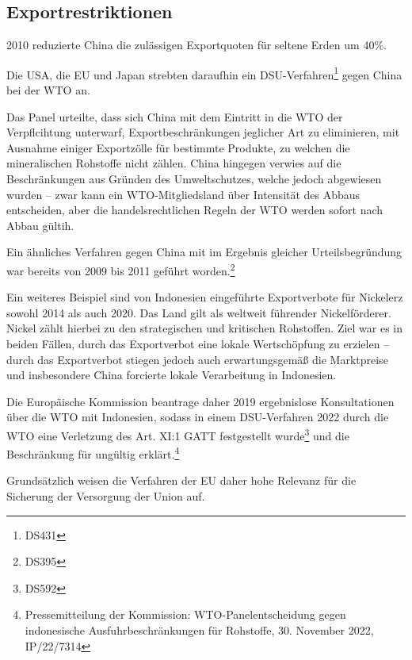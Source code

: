 \documentclass[12pt,a4paper,oneside]{book} %
\begin{document}
{	
	\subsection{Exportrestriktionen}
	
	2010 reduzierte China die zulässigen Exportquoten für seltene Erden um 40\%.
	
	Die USA, die EU und Japan strebten daraufhin ein DSU-Verfahren\footnote{DS431}  gegen China bei der WTO an.\autocite{EuZW 2012, 286}
	
	Das Panel urteilte, dass sich China mit dem Eintritt in die WTO der Verpflcihtung unterwarf, Exportbeschränkungen jeglicher Art zu eliminieren, mit Ausnahme einiger Exportzölle für bestimmte Produkte, zu welchen die mineralischen Rohstoffe nicht zählen. China hingegen verwies auf die Beschränkungen aus Gründen des Umweltschutzes, welche jedoch abgewiesen wurden -- zwar kann ein WTO-Mitgliedsland über Intensität des Abbaus entscheiden, aber die handelsrechtlichen Regeln der WTO werden sofort nach Abbau gültih.\autocites{EuZW 2014, 684}{EuZW 2014, 283}
	
	Ein ähnliches Verfahren gegen China mit im Ergebnis gleicher Urteilsbegründung war bereits von 2009 bis 2011 geführt worden.\footnote{DS395}

	Ein weiteres Beispiel sind von Indonesien eingeführte Exportverbote für Nickelerz sowohl 2014 als auch 2020. Das Land gilt als weltweit führender Nickelförderer.\autocite[52]{DERA Rohstoffinformation Indonesien, } Nickel zählt hierbei zu den strategischen und kritischen Rohstoffen. Ziel war es in beiden Fällen, durch das Exportverbot eine lokale Wertschöpfung zu erzielen -- durch das Exportverbot stiegen jedoch auch erwartungsgemäß die Marktpreise und insbesondere China forcierte lokale Verarbeitung in Indonesien.\autocite{DERA}
	
	Die Europäische Kommission beantrage daher 2019 ergebnislose Konsultationen über die WTO mit Indonesien, sodass in einem DSU-Verfahren 2022 durch die WTO eine Verletzung des Art. XI:1 GATT festgestellt wurde\footnote{DS592} und die Beschränkung für ungültig erklärt.\footnote{Pressemitteilung der Kommission: WTO-Panelentscheidung gegen indonesische Ausfuhrbeschränkungen für Rohstoffe, 30. November 2022, IP/22/7314}
	
	Grundsätzlich weisen die Verfahren der EU daher hohe Relevanz für die Sicherung der Versorgung der Union auf.
	
}
\end{document}

